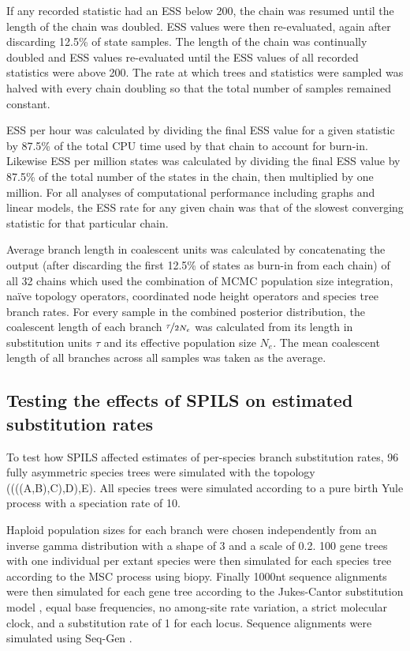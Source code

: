 \documentclass[12pt]{article}
\begin{document}
If any recorded statistic had an ESS below 200, the chain was resumed until the
length of the chain was doubled. ESS values were then re-evaluated, again after
discarding 12.5\% of state samples. The length of the chain was continually
doubled and ESS values re-evaluated until the ESS values of all recorded
statistics were above 200. The rate at which trees and statistics were sampled
was halved with every chain doubling so that the total number of samples
remained constant.

ESS per hour was calculated by dividing the final ESS value for a given
statistic by 87.5\% of the total CPU time used by that chain to account for
burn-in. Likewise ESS per million states was calculated by dividing the final
ESS value by 87.5\% of the total number of the states in the chain, then
multiplied by one million. For all analyses of computational performance
including graphs and linear models, the ESS rate for any given chain was that of
the slowest converging statistic for that particular chain.

Average branch length in coalescent units was calculated by concatenating the
output (after discarding the first 12.5\% of states as burn-in from each chain) of all 32 chains
which used the combination of MCMC population size integration, na\"ive topology
operators, coordinated node height operators and species tree branch rates. For
every sample in the combined posterior distribution, the coalescent length of
each branch $\nicefrac{\tau}{2N_e}$ was calculated from its length in
substitution units $\tau$ and its effective population size $N_e$. The mean
coalescent length of all branches across all samples was taken as the average.

\subsection{Testing the effects of SPILS on estimated substitution rates}

To test how SPILS affected estimates of per-species branch substitution rates,
96 fully asymmetric species trees were simulated with the topology
((((A,B),C),D),E). All species trees were simulated according to a pure birth Yule
process \citep{Yule21} with a speciation rate of 10.

Haploid population sizes for each branch were chosen independently from an
inverse gamma distribution with a shape of 3 and a scale of 0.2. 100 gene trees
with one individual per extant species were then simulated for each species tree
according to the MSC process using biopy. Finally 1000nt sequence alignments
were then simulated for each gene tree according to the Jukes-Cantor
substitution model \citep{JUKES196921}, equal base frequencies, no among-site
rate variation, a strict molecular clock, and a substitution rate of 1 for each
locus. Sequence alignments were simulated using Seq-Gen \citep{Rambaut01061997}.
\end{document}
